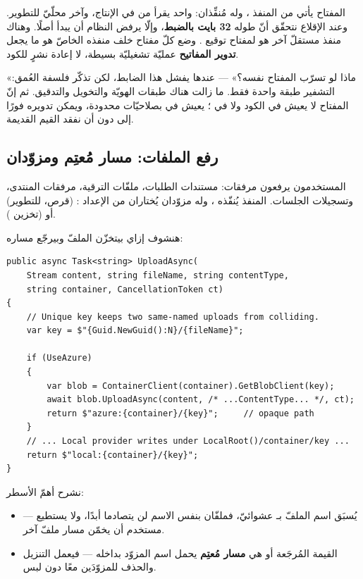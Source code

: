 المفتاح يأتي من المنفذ ، وله مُنفِّذان: واحد يقرأ
من  في الإنتاج، وآخر محلّيّ للتطوير. وعند الإقلاع نتحقّق أنّ طوله
\textbf{32 بايت بالضبط}، وإلّا يرفض النظام أن يبدأ أصلًا. وهناك منفذ مستقلّ آخر هو
 لمفتاح توقيع . وضع كلّ مفتاح خلف منفذه الخاصّ هو ما
يجعل \textbf{تدوير المفاتيح} عمليّة تشغيليّة بسيطة، لا إعادة نشرٍ للكود.

\begin{qa}
«ماذا لو تسرّب المفتاح نفسه؟» — عندها يفشل هذا الضابط، لكن تذكّر فلسفة العُمق:
التشفير طبقة واحدة فقط. ما زالت هناك طبقات الهويّة والتخويل والتدقيق. ثم إنّ المفتاح
لا يعيش في الكود ولا في ؛ يعيش في  بصلاحيّات محدودة، ويمكن
تدويره فورًا إلى  دون أن نفقد القيم القديمة.
\end{qa}

\subsection{رفع الملفات: مسار مُعتِم ومزوّدان}

المستخدمون يرفعون مرفقات: مستندات الطلبات، ملفّات الترقية، مرفقات المنتدى،
وتسجيلات الجلسات. المنفذ  يُنفّذه ،
وله مزوّدان يُختاران من الإعداد :  (قرص، للتطوير)
أو  (تخزين ).

هنشوف إزاي بيتخزّن الملفّ وبيرجّع مساره:

\begin{english}
\begin{lstlisting}[language={[Sharp]C}]
public async Task<string> UploadAsync(
    Stream content, string fileName, string contentType,
    string container, CancellationToken ct)
{
    // Unique key keeps two same-named uploads from colliding.
    var key = $"{Guid.NewGuid():N}/{fileName}";

    if (UseAzure)
    {
        var blob = ContainerClient(container).GetBlobClient(key);
        await blob.UploadAsync(content, /* ...ContentType... */, ct);
        return $"azure:{container}/{key}";     // opaque path
    }
    // ... Local provider writes under LocalRoot()/container/key ...
    return $"local:{container}/{key}";
}
\end{lstlisting}
\end{english}

نشرح أهمّ الأسطر:
\begin{itemize}
\item {} — يُسبَق اسم الملفّ
  بـ  عشوائيّ، فملفّان بنفس الاسم لن يتصادما أبدًا، ولا يستطيع مستخدم أن
  يخمّن مسار ملفّ آخر.
\item القيمة المُرجَعة  أو  هي
  \textbf{مسار مُعتِم}  يحمل اسم المزوّد بداخله — فيعمل التنزيل والحذف
  للمزوّدَين معًا دون لبس.
\end{itemize}

